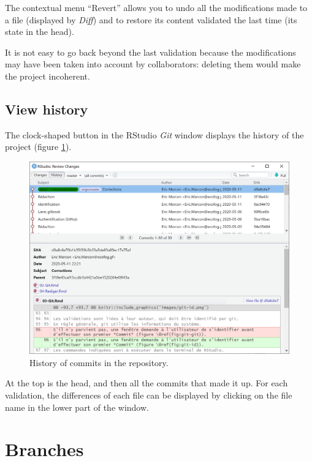 \documentclass[
  12pt,
  american,
  a4paper,
  extrafontsizes,onecolumn,openright
  ]{memoir}
\begin{document}
The contextual menu \enquote{Revert} allows you to undo all the modifications made to a file (displayed by \emph{Diff}) and to restore its content validated the last time (its state in the head).

It is not easy to go back beyond the last validation because the modifications may have been taken into account by collaborators: deleting them would make the project incoherent.

\hypertarget{view-history}{%
\subsection{View history}\label{view-history}}

The clock-shaped button in the RStudio \emph{Git} window displays the history of the project (figure \ref{fig:git-history}).



\scriptsize

\begin{figure}

{\centering \includegraphics[width=0.8\linewidth]{images/git-historique} 

}

\caption{History of commits in the repository.}\label{fig:git-history}
\end{figure}

\normalsize

At the top is the head, and then all the commits that made it up.
For each validation, the differences of each file can be displayed by clicking on the file name in the lower part of the window.

\hypertarget{sec:branches}{%
\section{Branches}\label{sec:branches}}
\end{document}
